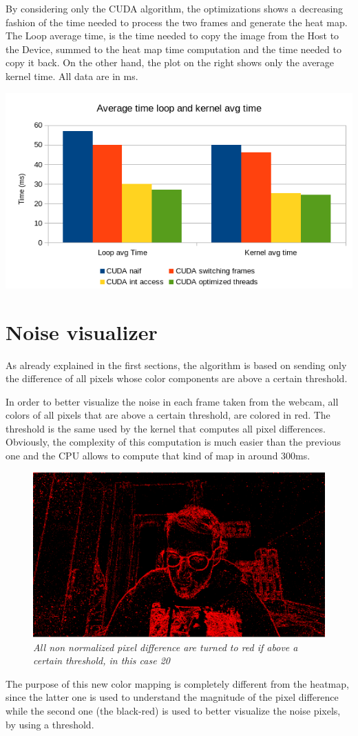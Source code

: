 \documentclass[paper=a4, fontsize=10pt]{scrartcl}	%
\begin{document}
	By considering only the CUDA algorithm, the optimizations shows a decreasing fashion of the time needed to process the two frames and generate the heat map. The Loop average time, is the time needed to copy the image from the Host to the Device, summed to the heat map time computation and the time needed to copy it back. On the other hand, the plot on the right shows only the average kernel time. All data are in ms. 
	\begin{center}
		\includegraphics[width=0.65\linewidth]{images/heatmap/histo_results}
	\end{center}
	
	
	\section{Noise visualizer}
	As already explained in the first sections, the algorithm is based on sending only the difference of all pixels whose color components are above a certain threshold.
	
	In order to better visualize the noise in each frame taken from the webcam, all colors of all pixels that are above a certain threshold, are colored in red. The threshold is the same used by the kernel that computes all pixel differences. Obviously, the complexity of this computation is much easier than the previous one and the CPU allows to compute that kind of map in around 300ms.
	\begin{figure}[H]
		\centering
		\includegraphics[width=0.4\linewidth]{images/heatmap/v0-red}
		\caption{\textit{All non normalized pixel difference are turned to red if above a certain threshold, in this case 20}}
		\label{fig:v0-red}
	\end{figure}
	The purpose of this new color mapping is completely different from the heatmap, since the latter one is used to understand the magnitude of the pixel difference while the second one (the black-red) is used to better visualize the noise pixels, by using a threshold.
	
\end{document}
